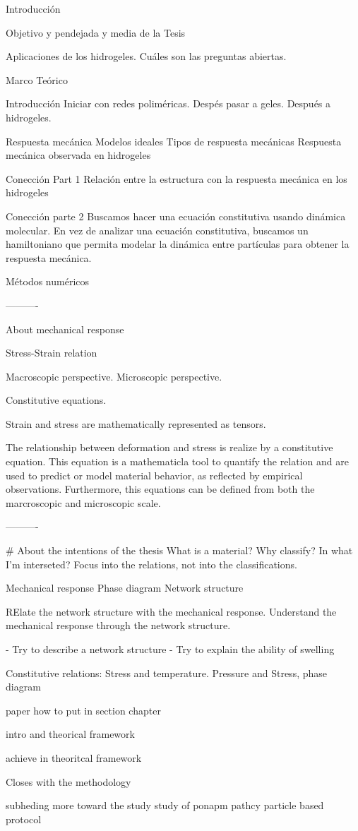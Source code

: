 Introducción

Objetivo y pendejada y media de la Tesis

Aplicaciones de los hidrogeles.
Cuáles son las preguntas abiertas.



Marco Teórico

Introducción
Iniciar con redes poliméricas.
Despés pasar a geles.
Después a hidrogeles.

Respuesta mecánica
Modelos ideales
Tipos de respuesta mecánicas
Respuesta mecánica observada en hidrogeles

Conección Part 1
Relación entre la estructura con la respuesta mecánica en los hidrogeles

Conección parte 2
Buscamos hacer una ecuación constitutiva usando dinámica molecular.
En vez de analizar una ecuación constitutiva, buscamos un hamiltoniano que permita modelar la dinámica entre partículas para obtener la respuesta mecánica.


Métodos numéricos

----------

About mechanical response

Stress-Strain relation

Macroscopic perspective.
Microscopic perspective.

Constitutive equations.

Strain and stress are mathematically represented as tensors.

The relationship between deformation and stress is realize by a constitutive equation.
This equation is a mathematicla tool to quantify the relation and are used to predict or model material behavior, as reflected by empirical observations.
Furthermore, this equations can be defined from both the marcroscopic and microscopic scale.


----------

# About the intentions of the thesis
What is a material?
Why classify?
In what I'm interseted?
Focus into the relations, not into the classifications.

Mechanical response
Phase diagram
Network structure

RElate the network structure with the mechanical response.
Understand the mechanical response through the network structure.

- Try to describe a network structure
- Try to explain the ability of swelling

Constitutive relations: Stress and temperature.
Pressure and Stress, phase diagram






paper how to put in section chapter

intro and theorical framework

achieve in theoritcal framework

Closes with the methodology

subheding more
toward the study
study of ponapm pathcy particle based protocol



























